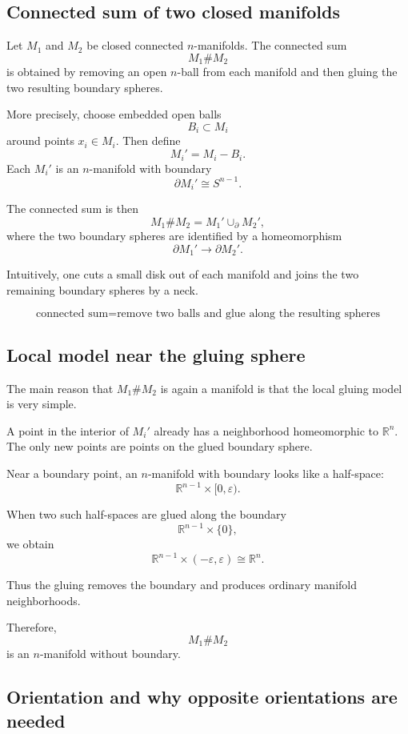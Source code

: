 \documentclass[12pt,a4paper]{article}
\theoremstyle{notespace}
\begin{document}
\subsection{Connected sum of two closed manifolds}

Let \(M_1\) and \(M_2\) be closed connected \(n\)-manifolds. The connected sum
\[
M_1\# M_2
\]
is obtained by removing an open \(n\)-ball from each manifold and then gluing the
two resulting boundary spheres.

More precisely, choose embedded open balls
\[
B_i\subset M_i
\]
around points \(x_i\in M_i\). Then define
\[
M_i'=M_i-B_i.
\]
Each \(M_i'\) is an \(n\)-manifold with boundary
\[
\partial M_i'\cong S^{n-1}.
\]

The connected sum is then
\[
M_1\# M_2
=
M_1'\cup_{\partial} M_2',
\]
where the two boundary spheres are identified by a homeomorphism
\[
\partial M_1'\longrightarrow \partial M_2'.
\]

Intuitively, one cuts a small disk out of each manifold and joins the two
remaining boundary spheres by a neck.

\[
\boxed{
	\text{connected sum}
	=
	\text{remove two balls and glue along the resulting spheres}
}
\]

\subsection{Local model near the gluing sphere}

The main reason that \(M_1\#M_2\) is again a manifold is that the local gluing
model is very simple.

A point in the interior of \(M_i'\) already has a neighborhood homeomorphic to
\(\mathbb{R}^n\). The only new points are points on the glued boundary sphere.

Near a boundary point, an \(n\)-manifold with boundary looks like a half-space:
\[
\mathbb{R}^{n-1}\times [0,\varepsilon).
\]

When two such half-spaces are glued along the boundary
\[
\mathbb{R}^{n-1}\times \{0\},
\]
we obtain
\[
\mathbb{R}^{n-1}\times (-\varepsilon,\varepsilon)
\cong
\mathbb{R}^n.
\]

Thus the gluing removes the boundary and produces ordinary manifold
neighborhoods.

Therefore,
\[
M_1\#M_2
\]
is an \(n\)-manifold without boundary.

\subsection{Orientation and why opposite orientations are needed}
\end{document}
